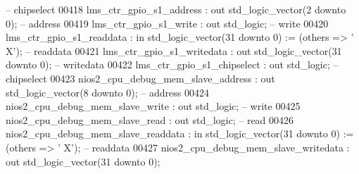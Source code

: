 \begin{DoxyCode}
           \textcolor{keyword}{-- chipselect}
00418             lms\_ctr\_gpio\_s1\_address                     : \textcolor{keywordflow}{out} \textcolor{comment}{std\_logic\_vector}(\textcolor{vhdllogic}{}\textcolor{vhdllogic}{2} \textcolor{keywordflow}{downto} \textcolor{vhdllogic}{}\textcolor{vhdllogic}{0});                
           \textcolor{keyword}{-- address}
00419             lms\_ctr\_gpio\_s1\_write                       : \textcolor{keywordflow}{out} \textcolor{comment}{std\_logic};                                   
           \textcolor{keyword}{-- write}
00420             lms\_ctr\_gpio\_s1\_readdata                    : \textcolor{keywordflow}{in}  \textcolor{comment}{std\_logic\_vector}(\textcolor{vhdllogic}{}\textcolor{vhdllogic}{31} \textcolor{keywordflow}{downto} \textcolor{vhdllogic}{}\textcolor{vhdllogic}{0}) := (\textcolor{keywordflow}{others} => '
      X'); \textcolor{keyword}{-- readdata}
00421             lms\_ctr\_gpio\_s1\_writedata                   : \textcolor{keywordflow}{out} \textcolor{comment}{std\_logic\_vector}(\textcolor{vhdllogic}{}\textcolor{vhdllogic}{31} \textcolor{keywordflow}{downto} \textcolor{vhdllogic}{}\textcolor{vhdllogic}{0});               
           \textcolor{keyword}{-- writedata}
00422             lms\_ctr\_gpio\_s1\_chipselect                  : \textcolor{keywordflow}{out} \textcolor{comment}{std\_logic};                                   
           \textcolor{keyword}{-- chipselect}
00423             nios2\_cpu\_debug\_mem\_slave\_address           : \textcolor{keywordflow}{out} \textcolor{comment}{std\_logic\_vector}(\textcolor{vhdllogic}{}\textcolor{vhdllogic}{8} \textcolor{keywordflow}{downto} \textcolor{vhdllogic}{}\textcolor{vhdllogic}{0});                
           \textcolor{keyword}{-- address}
00424             nios2\_cpu\_debug\_mem\_slave\_write             : \textcolor{keywordflow}{out} \textcolor{comment}{std\_logic};                                   
           \textcolor{keyword}{-- write}
00425             nios2\_cpu\_debug\_mem\_slave\_read              : \textcolor{keywordflow}{out} \textcolor{comment}{std\_logic};                                   
           \textcolor{keyword}{-- read}
00426             nios2\_cpu\_debug\_mem\_slave\_readdata          : \textcolor{keywordflow}{in}  \textcolor{comment}{std\_logic\_vector}(\textcolor{vhdllogic}{}\textcolor{vhdllogic}{31} \textcolor{keywordflow}{downto} \textcolor{vhdllogic}{}\textcolor{vhdllogic}{0}) := (\textcolor{keywordflow}{others} => '
      X'); \textcolor{keyword}{-- readdata}
00427             nios2\_cpu\_debug\_mem\_slave\_writedata         : \textcolor{keywordflow}{out} \textcolor{comment}{std\_logic\_vector}(\textcolor{vhdllogic}{}\textcolor{vhdllogic}{31} \textcolor{keywordflow}{downto} \textcolor{vhdllogic}{}\textcolor{vhdllogic}{0});               

\end{DoxyCode}
